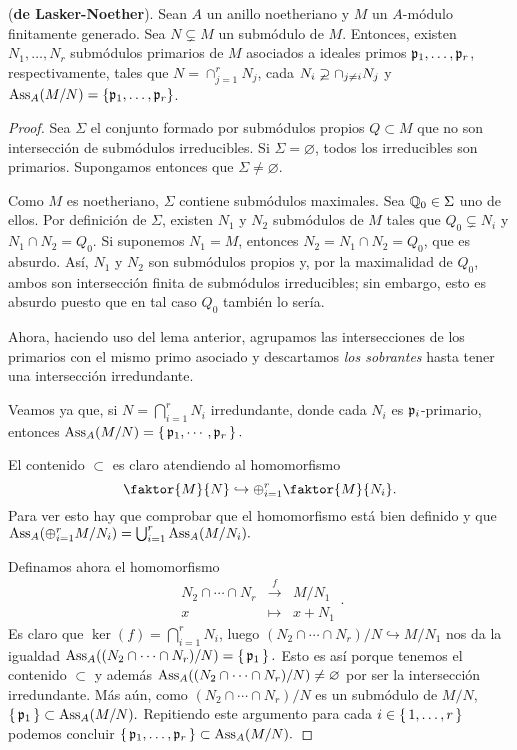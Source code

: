 \documentclass[../main.tex]{subfiles}
\begin{document}
	\begin{theorem} (\textbf{de Lasker-Noether}).
		Sean $A$ un anillo noetheriano y $M$ un $A$-módulo finitamente generado. Sea $N\varsubsetneq M$ un submódulo de $M$. Entonces, existen $N_1,\dots,N_r$ submódulos primarios de $M$ asociados a ideales primos $\mathfrak{p}_1,\dots,\mathfrak{p}_r$, respectivamente, tales que $N=\cap_{j=1}^rN_j$, cada $N_i\varsupsetneq\cap_{j\neq i}N_j$ y $\text{Ass}_A(M/N)=\{\mathfrak{p}_1,\dots,\mathfrak{p}_r\}$.
	\end{theorem}
	
	\begin{proof}
		Sea $\Sigma$ el conjunto formado por submódulos propios $Q\subset M$ que no son intersección de submódulos irreducibles. Si $\Sigma=\varnothing$, todos los irreducibles son primarios. Supongamos entonces que $\Sigma\neq\varnothing.$
		
		Como $M$ es noetheriano, $\Sigma$ contiene submódulos maximales. Sea $\mathbb{Q}_0\in\Sigma$ uno de ellos. Por definición de $\Sigma$, existen $N_1$ y $N_2$ submódulos de $M$ tales que $Q_0\subsetneq N_i$ y $N_1\cap N_2=Q_0.$ Si suponemos $N_1=M$, entonces $N_2=N_1\cap N_2=Q_0$, que es absurdo. Así, $N_1$ y $N_2$ son submódulos propios y, por la maximalidad de $Q_0$, ambos son intersección finita de submódulos irreducibles; sin embargo, esto es absurdo puesto que en tal caso $Q_0$ también lo sería.
		
		Ahora, haciendo uso del lema anterior, agrupamos las intersecciones de los primarios con el mismo primo asociado y descartamos \textit{los sobrantes} hasta tener una intersección irredundante. 
		
		Veamos ya que, si $N=\bigcap_{i=1}^rN_i$ irredundante, donde cada $N_i$ es $\mathfrak{p}_i$-primario, entonces $\text{Ass}_A(M/N)=\set{\mathfrak{p}_1,\cdots,\mathfrak{p}_r}.$
		
		El contenido $\subset$ es claro atendiendo al homomorfismo
		$$\faktor{M}{N}\hookrightarrow\oplus_{i=1}^r\faktor{M}{N_i}.$$
		Para ver esto hay que comprobar que el homomorfismo está bien definido y que $\text{Ass}_A(\oplus_{i=1}^rM/{N_i})=\bigcup_{i=1}^r\text{Ass}_A(M/{N_i}).$
		
		Definamos ahora el homomorfismo
		$$\begin{array}{rcl}
		N_2\cap\cdots\cap N_r&\overset{f}{\longrightarrow}&M/N_1\\
		x&\longmapsto&x+N_1 
		\end{array}.$$
		Es claro que $\ker(f)=\bigcap_{i=1}^r N_i$, luego $(N_2\cap\cdots\cap N_r)/N\hookrightarrow M/{N_1}$ nos da la igualdad $\text{Ass}_A((N_2\cap\cdots\cap N_r)/N)=\set{\mathfrak{p}_1}.$ Esto es así porque tenemos el contenido $\subset$ y además $\text{Ass}_A((N_2\cap\cdots\cap N_r)/N)\neq\varnothing$ por ser la intersección irredundante. Más aún, como $(N_2\cap\cdots\cap N_r)/N$ es un submódulo de $M/N$, $\set{\mathfrak{p}_1}\subset\text{Ass}_A(M/N).$ Repitiendo este argumento para cada $i\in\set{1,\dots,r}$ podemos concluir $\set{\mathfrak{p}_1,\dots,\mathfrak{p}_r}\subset\text{Ass}_A(M/N).$
	\end{proof}
	
\end{document}
